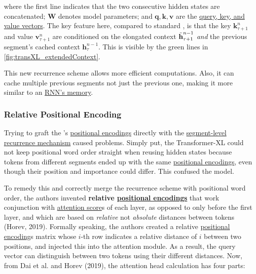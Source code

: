 where the first line indicates that the two consecutive hidden states are concatenated; $\textbf{W}$ denotes model parameters; and $\textbf{q}, \textbf{k}, \textbf{v}$ are the \hyperref[sec:QKV]{query, key, and value vectors}. The key feature here, compared to standard , is that the key $\textbf{k}_{\tau+1}^n$ and value $\textbf{v}_{\tau+1}^n$ are conditioned on the elongated context $\Tilde{\textbf{h}}_{\tau+1}^{n-1}$ \emph{and} the previous segment's cached context $\textbf{h}_\tau^{n-1}$. This is visible by the green lines in \cref{fig:transXL_extendedContext}.  

This new recurrence scheme allows more efficient computations. Also, it can cache multiple previous segments not just the previous one, making it more similar to an \hyperref[sec:RNN]{RNN's memory}. 




\subsubsection{Relative Positional Encoding} \label{sec:RelativePosEnc}

Trying to graft the 's \hyperref[sec:PosEncodings]{positional encodings} directly with the \hyperref[sec:SegmentLevelRec]{segment-level recurrence mechanism} caused problems. Simply put, the Transformer-XL could not keep positional word order straight when reusing hidden states because tokens from different segments ended up with the same \hyperref[sec:PosEncodings]{positional encodings}, even though their position and importance could differ. This confused the model. 

To remedy this and correctly merge the recurrence scheme with positional word order, the authors invented \textbf{relative \hyperref[sec:PosEncodings]{positional encodings}} that work conjunction with \hyperref[sec:AttentionMechanism]{attention score}s of each layer, as opposed to only before the first layer, and which are based on \emph{relative} not \emph{absolute} distances between tokens (Horev, 2019). Formally speaking, the authors created a relative \hyperref[sec:PosEncodings]{positional encoding}s matrix whose $i$-th row indicates a relative distance of $i$ between two positions, and injected this into the attention module. As a result, the query vector can distinguish between two tokens using their different distances. Now, from Dai et al. and Horev (2019), the attention head calculation has four parts: 

